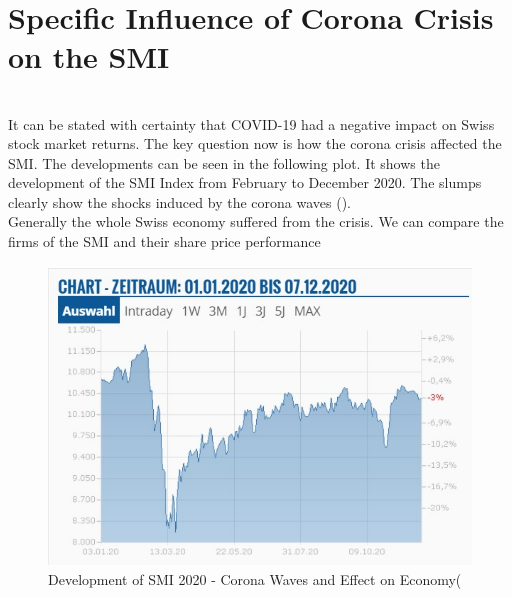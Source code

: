 \documentclass[11pt,a4paper]{article}
\begin{document}
\\
\section{Specific Influence of Corona Crisis on the SMI}

\\
It can be stated with certainty that COVID-19 had a negative impact on Swiss stock market returns.
The key question now is how the corona crisis affected the SMI. The developments can be seen in the following plot. It shows the development of the SMI Index from February to December 2020. The slumps clearly show the shocks induced by the corona waves (\cite{DOminicBenz}).\\
Generally the whole Swiss economy suffered from the crisis. We can compare the firms of the SMI and their share price performance 

\vspace{20mm}

\newline
\begin{figure}[h]
    \centering
    \caption{Development of SMI 2020 - Corona Waves and Effect on Economy(\cite{Investopedia(2020)}}
\includegraphics[width=130mm]{AktuellSMI.jpg}
\end{figure}
\end{document}
